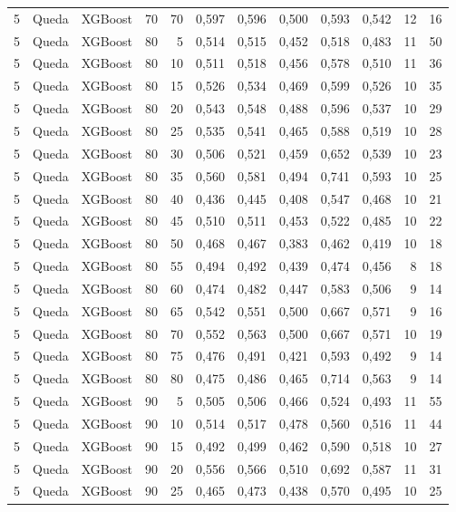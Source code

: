 \begin{longtable}{@{}rllrrrrrrrrr@{}}
5 & Queda & XGBoost & 70 & 70 & 0,597 & 0,596 & 0,500 & 0,593 & 0,542 & 12 & 16 \\
5 & Queda & XGBoost & 80 & 5 & 0,514 & 0,515 & 0,452 & 0,518 & 0,483 & 11 & 50 \\
5 & Queda & XGBoost & 80 & 10 & 0,511 & 0,518 & 0,456 & 0,578 & 0,510 & 11 & 36 \\
5 & Queda & XGBoost & 80 & 15 & 0,526 & 0,534 & 0,469 & 0,599 & 0,526 & 10 & 35 \\
5 & Queda & XGBoost & 80 & 20 & 0,543 & 0,548 & 0,488 & 0,596 & 0,537 & 10 & 29 \\
5 & Queda & XGBoost & 80 & 25 & 0,535 & 0,541 & 0,465 & 0,588 & 0,519 & 10 & 28 \\
5 & Queda & XGBoost & 80 & 30 & 0,506 & 0,521 & 0,459 & 0,652 & 0,539 & 10 & 23 \\
5 & Queda & XGBoost & 80 & 35 & 0,560 & 0,581 & 0,494 & 0,741 & 0,593 & 10 & 25 \\
5 & Queda & XGBoost & 80 & 40 & 0,436 & 0,445 & 0,408 & 0,547 & 0,468 & 10 & 21 \\
5 & Queda & XGBoost & 80 & 45 & 0,510 & 0,511 & 0,453 & 0,522 & 0,485 & 10 & 22 \\
5 & Queda & XGBoost & 80 & 50 & 0,468 & 0,467 & 0,383 & 0,462 & 0,419 & 10 & 18 \\
5 & Queda & XGBoost & 80 & 55 & 0,494 & 0,492 & 0,439 & 0,474 & 0,456 & 8 & 18 \\
5 & Queda & XGBoost & 80 & 60 & 0,474 & 0,482 & 0,447 & 0,583 & 0,506 & 9 & 14 \\
5 & Queda & XGBoost & 80 & 65 & 0,542 & 0,551 & 0,500 & 0,667 & 0,571 & 9 & 16 \\
5 & Queda & XGBoost & 80 & 70 & 0,552 & 0,563 & 0,500 & 0,667 & 0,571 & 10 & 19 \\
5 & Queda & XGBoost & 80 & 75 & 0,476 & 0,491 & 0,421 & 0,593 & 0,492 & 9 & 14 \\
5 & Queda & XGBoost & 80 & 80 & 0,475 & 0,486 & 0,465 & 0,714 & 0,563 & 9 & 14 \\
5 & Queda & XGBoost & 90 & 5 & 0,505 & 0,506 & 0,466 & 0,524 & 0,493 & 11 & 55 \\
5 & Queda & XGBoost & 90 & 10 & 0,514 & 0,517 & 0,478 & 0,560 & 0,516 & 11 & 44 \\
5 & Queda & XGBoost & 90 & 15 & 0,492 & 0,499 & 0,462 & 0,590 & 0,518 & 10 & 27 \\
5 & Queda & XGBoost & 90 & 20 & 0,556 & 0,566 & 0,510 & 0,692 & 0,587 & 11 & 31 \\
5 & Queda & XGBoost & 90 & 25 & 0,465 & 0,473 & 0,438 & 0,570 & 0,495 & 10 & 25 \\

\end{longtable}
